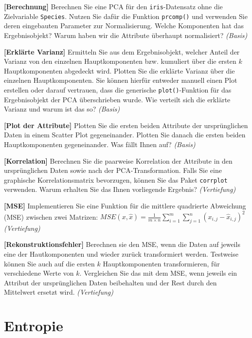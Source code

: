 \documentclass[headinclude,headsepline]{scrartcl}
\newcommand{\taskcategory}[1]{{\color[HTML]{800000}\emph{(#1)}}}
\newcommand{\taskname}[1]{\textbf{[#1]}}
\newcommand{\code}[1]{{\color[HTML]{000080}\texttt{#1}}}
\begin{document}
\begin{compactenum}[a)]\itemsep10pt
	\item
	\taskname{Berechnung}
	Berechnen Sie eine PCA für den \code{iris}-Datensatz ohne die Zielvariable \code{Species}.
	Nutzen Sie dafür die Funktion \code{prcomp()} und verwenden Sie deren eingebauten Parameter zur Normalisierung.
	Welche Komponenten hat das Ergebnisobjekt?
	Warum haben wir die Attribute überhaupt normalisiert?
	\taskcategory{Basis}
	\item
	\taskname{Erklärte Varianz}
	Ermitteln Sie aus dem Ergebnisobjekt, welcher Anteil der Varianz von den einzelnen Hauptkomponenten bzw. kumuliert über die ersten $k$ Hauptkomponenten abgedeckt wird.
	Plotten Sie die erklärte Varianz über die einzelnen Hauptkomponenten.
	Sie können hierfür entweder manuell einen Plot erstellen oder darauf vertrauen, dass die generische \code{plot()}-Funktion für das Ergebnisobjekt der PCA überschrieben wurde.
	Wie verteilt sich die erklärte Varianz und warum ist das so?
	\taskcategory{Basis}
	\item
	\taskname{Plot der Attribute}
	Plotten Sie die ersten beiden Attribute der ursprünglichen Daten in einem Scatter Plot gegeneinander.
	Plotten Sie danach die ersten beiden Hauptkomponenten gegeneinander.
	Was fällt Ihnen auf?
	\taskcategory{Basis}
	\item
	\taskname{Korrelation}
	Berechnen Sie die paarweise Korrelation der Attribute in den ursprüngli\-chen Daten sowie nach der PCA-Transformation.
	Falls Sie eine graphische Korrelationsmatrix bevorzugen, können Sie das Paket \code{corrplot} verwenden.
	Warum erhalten Sie das Ihnen vorliegende Ergebnis?
	\taskcategory{Vertiefung}
	\item
	\taskname{MSE}
	Implementieren Sie eine Funktion für die mittlere quadrierte Abweichung (MSE) zwischen zwei Matrizen:  $MSE(x,\hat{x}) = \frac{1}{m \times n} \sum_{i=1}^{m} \sum_{j=1}^{n} (x_{i,j} - \hat{x}_{i,j})^2$
	\taskcategory{Vertiefung}
	\item
	\taskname{Rekonstruktionsfehler}
	Berechnen sie den MSE, wenn die Daten auf jeweils eine der Hautkomponenten und wieder zurück transformiert werden.
	Testweise können Sie auch auf die ersten $k$ Hauptkomponenten transformieren, für verschiedene Werte von $k$.
	Vergleichen Sie das mit dem MSE, wenn jeweils ein Attribut der ursprünglichen Daten beibehalten und der Rest durch den Mittelwert ersetzt wird.
	\taskcategory{Vertiefung}
\end{compactenum}

\section{Entropie}
\end{document}
